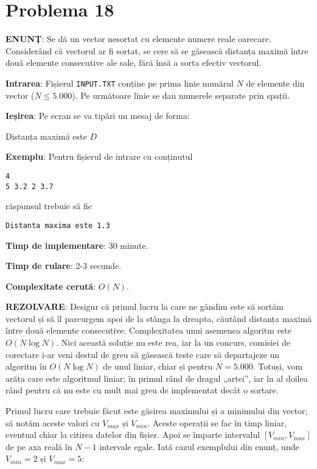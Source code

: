 \section{Problema 18}

{\bf ENUNȚ}: Se dă un vector nesortat cu elemente numere reale
oarecare. Considerând că vectorul ar fi sortat, se cere să se găsească
distanța maximă între două elemente consecutive ale sale, fără însă a sorta
efectiv vectorul.

{\bf Intrarea}: Fișierul {\tt INPUT.TXT} conține pe prima linie numărul $N$ de
elemente din vector ($N \leq 5.000$). Pe următoare linie se dau numerele
separate prin spații.

{\bf Ieșirea}: Pe ecran se va tipări un mesaj de forma:

Distanța maximă este $D$

{\bf Exemplu}: Pentru fișierul de intrare cu conținutul

\begin{verbatim}
4
5 3.2 2 3.7
\end{verbatim}

răspunsul trebuie să fie

\begin{verbatim}
Distanta maxima este 1.3
\end{verbatim}

{\bf Timp de implementare}: 30 minute.

{\bf Timp de rulare}: 2-3 secunde.

{\bf Complexitate cerută}: $O(N)$.

{\bf REZOLVARE}: Desigur că primul lucru la care ne gândim este să sortăm
vectorul și să îl parcurgem apoi de la stânga la dreapta, căutând distanța
maximă între două elemente consecutive. Complexitatea unui asemenea algoritm
este $O(N \log N)$. Nici această soluție nu este rea, iar la un concurs,
comisiei de corectare i-ar veni destul de greu să găsească teste care să
departajeze un algoritm în $O(N \log N)$ de unul liniar, chiar și pentru $N =
5.000$. Totuși, vom arăta care este algoritmul liniar; în primul rând de
dragul „artei”, iar în al doilea rând pentru că nu este cu mult mai greu de
implementat decât o sortare.

Primul lucru care trebuie făcut este găsirea maximului și a minimului din
vector; să notăm aceste valori cu $V_{max}$ și $V_{min}$. Aceste operații se
fac în timp liniar, eventual chiar la citirea datelor din fișier. Apoi se
împarte intervalul $[V_{min}, V_{max}]$ de pe axa reală în $N-1$ intervale
egale. Iată cazul exemplului din enunț, unde $V_{min} = 2$ și $V_{max} = 5$:

